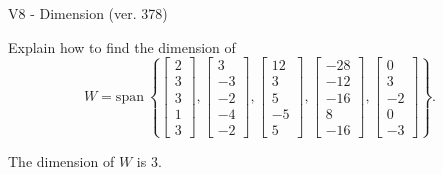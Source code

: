 \begin{exercise}
  \begin{exerciseTitle}V8 - Dimension (ver. 378)\end{exerciseTitle}
  \begin{exerciseStatement}
    Explain how to find the dimension of 
\[W=\mathrm{span}\ \left\{\left[\begin{array}{r}
2 \\
3 \\
3 \\
1 \\
3
\end{array}\right] , \left[\begin{array}{r}
3 \\
-3 \\
-2 \\
-4 \\
-2
\end{array}\right] , \left[\begin{array}{r}
12 \\
3 \\
5 \\
-5 \\
5
\end{array}\right] , \left[\begin{array}{r}
-28 \\
-12 \\
-16 \\
8 \\
-16
\end{array}\right] , \left[\begin{array}{r}
0 \\
3 \\
-2 \\
0 \\
-3
\end{array}\right]\right\}.\]



  \end{exerciseStatement}
  \begin{exerciseAnswer}
   The dimension of \(W\) is  \(3\).
  


  \end{exerciseAnswer}
\end{exercise}
